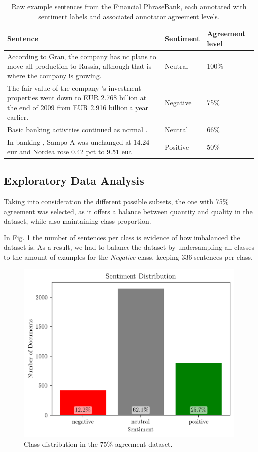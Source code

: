 \documentclass[conference]{IEEEtran}
\begin{document}
\begin{table}[H]
\centering
\caption{Raw example sentences from the Financial PhraseBank, each annotated with sentiment labels and associated annotator agreement levels.}
\label{tab:fpb_examples}
\begin{tabular}{p{4.0cm}p{1.8cm}p{1.5cm}}
\toprule
\textbf{Sentence} & \textbf{Sentiment} & \textbf{Agreement level} \\
\midrule
According to Gran, the company has no plans to move all production to Russia, although that is where the company is growing. & Neutral & 100\% \\
The fair value of the company 's investment properties went down to EUR 2.768 billion at the end of 2009 from EUR 2.916 billion a year earlier. & Negative & 75\% \\
Basic banking activities continued as normal . & Neutral & 66\% \\
In banking , Sampo A was unchanged at 14.24 eur and Nordea rose 0.42 pct to 9.51 eur. & Positive & 50\% \\
\bottomrule
\end{tabular}
\end{table}

\subsection{Exploratory Data Analysis}

Taking into consideration the different possible subsets, the one with 75\% agreement was selected, as it offers a balance between quantity and quality in the dataset, while also maintaining class proportion.

In Fig. \ref{fig:sentiment_distribution} the number of sentences per class is evidence of how imbalanced the dataset is. As a result, we had to balance the dataset by undersampling all classes to the amount of examples for the \textit{Negative} class, keeping 336 sentences per class.

\begin{figure}[H]
    \centering
    \includegraphics[width=1\linewidth]{assets/sentiment_distribution.png}
    \caption{Class distribution in the 75\% agreement dataset.}
    \label{fig:sentiment_distribution}
\end{figure}
\end{document}

